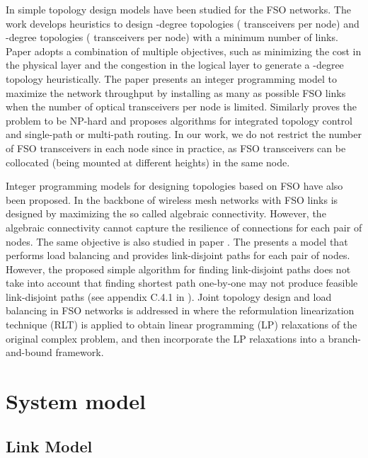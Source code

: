 \documentclass[onecolumn,11pt,draftclsnofoot]{IEEEtran}
\begin{document}
In \cite{Llorca2004, Zhuang2004, Cao2008} simple topology design models have been studied for the FSO networks. The work \cite{Llorca2004} develops heuristics to design -degree topologies ( transceivers per node) and -degree topologies ( transceivers per node) with a minimum number of links. Paper \cite{Zhuang2004} adopts a combination of multiple objectives, such as minimizing the cost in the physical layer and the congestion in the logical layer to generate a -degree topology heuristically. The paper \cite{Cao2008} presents an integer programming model to maximize the network throughput by installing as many as possible FSO links when the number of optical transceivers per node is limited. Similarly \cite{Abhish2007} proves the problem to be NP-hard and proposes algorithms for integrated topology control
and single-path or multi-path routing. In our work, we do not restrict the number of FSO transceivers in each node since in practice, as FSO transceivers can be collocated (being mounted at different heights) in the same node.

Integer programming models for designing topologies based on FSO have also been proposed. In \cite{Son2010} the backbone of wireless mesh networks with FSO links is designed by maximizing the so called algebraic connectivity. However, the algebraic connectivity cannot capture the resilience of connections for each pair of nodes.  The same objective is also studied in paper \cite{Zhou2013}.
The \cite{Ouveysi2010} presents a model that performs load balancing and provides link-disjoint paths for each pair of nodes. However, the proposed simple algorithm for finding link-disjoint paths does not take into account that finding shortest path one-by-one may not produce feasible link-disjoint paths (see appendix C.4.1 in \cite{pioro2004}).
Joint topology design and load balancing in FSO networks is addressed in \cite{Son2014} where the reformulation linearization technique (RLT) is applied to obtain linear programming (LP) relaxations of the original complex problem, and then incorporate the LP relaxations into a branch-and-bound framework.


\section{System model}\label{sec:system}

\subsection{Link Model}
\end{document}
